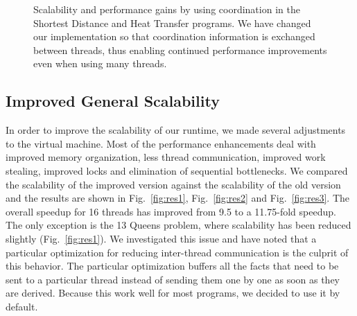 \documentclass[10pt]{article}
\begin{document}
\begin{figure}[hb]
\begin{center}
\end{center}
\caption{Scalability and performance gains by using coordination in the Shortest
Distance and Heat Transfer programs. We have changed our implementation so that
coordination information is exchanged between threads, thus enabling
continued performance improvements even when using many threads.}
\label{fig:coord_others}
\end{figure}

\subsection{Improved General Scalability}

In order to improve the scalability of our runtime, we made several adjustments
to the virtual machine. Most of the performance enhancements deal with improved
memory organization, less thread communication, improved work stealing, improved
locks and elimination of sequential bottlenecks. We compared the scalability of the
improved version against the scalability of the old version and the results are
shown in Fig.~\ref{fig:res1}, Fig.~\ref{fig:res2} and Fig.~\ref{fig:res3}. The
overall speedup for 16 threads has improved from 9.5 to a 11.75-fold speedup.
The only exception is the 13 Queens problem, where scalability has been reduced
slightly (Fig.~\ref{fig:res1}). We investigated this issue and have noted that
a particular optimization for reducing inter-thread communication is the culprit
of this behavior. The particular optimization buffers all the facts
that need to be sent to a particular thread instead of sending them one by one as
soon as they are derived. Because this work well for most programs, we decided to
use it by default.
\end{document}
